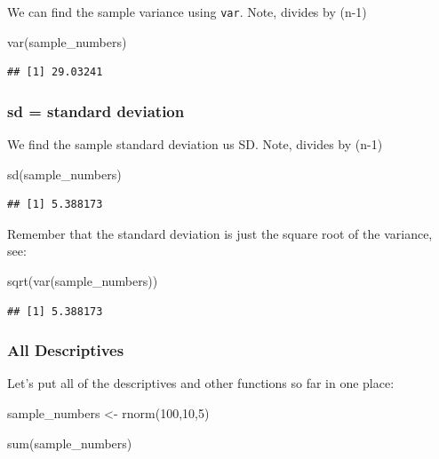 \documentclass[
]{book}
\newenvironment{Shaded}{\begin{snugshade}}{\end{snugshade}}
\newcommand{\DecValTok}[1]{\textcolor[rgb]{0.00,0.00,0.81}{#1}}
\newcommand{\FunctionTok}[1]{\textcolor[rgb]{0.00,0.00,0.00}{#1}}
\newcommand{\NormalTok}[1]{#1}
\newcommand{\OtherTok}[1]{\textcolor[rgb]{0.56,0.35,0.01}{#1}}
\begin{document}
We can find the sample variance using \texttt{var}. Note, divides by (n-1)

\begin{Shaded}
\begin{Highlighting}[]
\FunctionTok{var}\NormalTok{(sample\_numbers)}
\end{Highlighting}
\end{Shaded}

\begin{verbatim}
## [1] 29.03241
\end{verbatim}

\hypertarget{sd-standard-deviation}{%
\subsubsection{sd = standard deviation}\label{sd-standard-deviation}}

We find the sample standard deviation us SD. Note, divides by (n-1)

\begin{Shaded}
\begin{Highlighting}[]
\FunctionTok{sd}\NormalTok{(sample\_numbers)}
\end{Highlighting}
\end{Shaded}

\begin{verbatim}
## [1] 5.388173
\end{verbatim}

Remember that the standard deviation is just the square root of the variance, see:

\begin{Shaded}
\begin{Highlighting}[]
\FunctionTok{sqrt}\NormalTok{(}\FunctionTok{var}\NormalTok{(sample\_numbers))}
\end{Highlighting}
\end{Shaded}

\begin{verbatim}
## [1] 5.388173
\end{verbatim}

\hypertarget{all-descriptives}{%
\subsubsection{All Descriptives}\label{all-descriptives}}

Let's put all of the descriptives and other functions so far in one place:

\begin{Shaded}
\begin{Highlighting}[]
\NormalTok{sample\_numbers }\OtherTok{\textless{}{-}} \FunctionTok{rnorm}\NormalTok{(}\DecValTok{100}\NormalTok{,}\DecValTok{10}\NormalTok{,}\DecValTok{5}\NormalTok{)}

\FunctionTok{sum}\NormalTok{(sample\_numbers)}
\end{Highlighting}
\end{Shaded}
\end{document}
